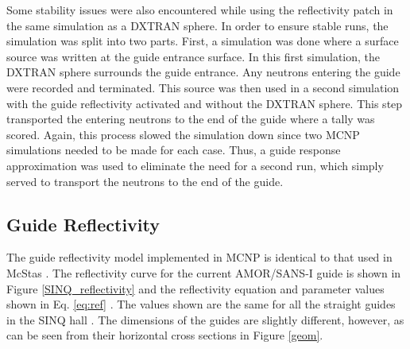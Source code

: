 \documentclass[preprint,12pt]{elsarticle}
\begin{document}
Some stability issues were also encountered while using the reflectivity patch in the same simulation as a DXTRAN sphere.  In order to ensure stable runs, the simulation was split into two parts.  First, a simulation was done where a surface source was written at the guide entrance surface.  In this first simulation, the DXTRAN sphere surrounds the guide entrance.  Any neutrons entering the guide were recorded and terminated.  This source was then used in a second simulation with the guide reflectivity activated and without the DXTRAN sphere.  This step transported the entering neutrons to the end of the guide where a tally was scored.  Again, this process slowed the simulation down since two MCNP simulations needed to be made for each case.  Thus, a guide response approximation was used to eliminate the need for a second run, which simply served to transport the neutrons to the end of the guide.


\subsection{Guide Reflectivity}

The guide reflectivity model implemented in MCNP is identical to that used in McStas \cite{mcnp_reflectivity}.  The reflectivity curve for the current AMOR/SANS-I guide is shown in Figure \ref{SINQ_reflectivity} and the reflectivity equation and parameter values shown in Eq. \ref{eq:ref} \cite{mcstas}.  The values shown are the same for all the straight guides in the SINQ hall \cite{SINQ_guide_values}.  The dimensions of the guides are slightly different, however, as can be seen from their horizontal cross sections in Figure \ref{geom}.
\end{document}
